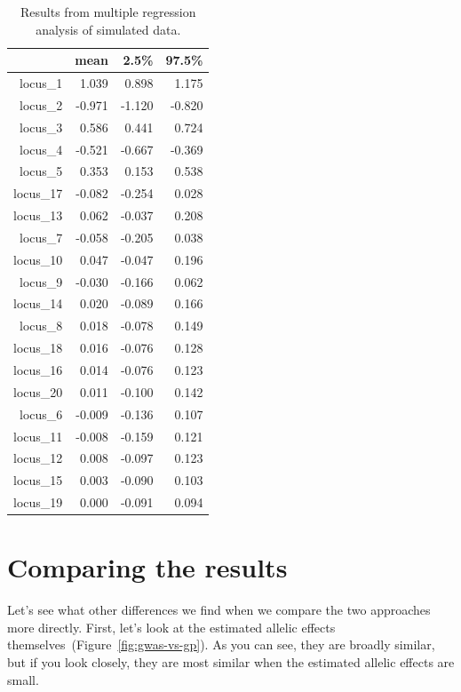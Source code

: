 \documentclass[12pt]{article}
\begin{document}
\begin{table}
\centering
\begin{tabular}{rrrr}
  \hline
 & mean & 2.5\% & 97.5\% \\ 
  \hline
locus\_1 & 1.039 & 0.898 & 1.175 \\
locus\_2 & -0.971 & -1.120 & -0.820 \\
locus\_3 & 0.586 & 0.441 & 0.724 \\
locus\_4 & -0.521 & -0.667 & -0.369 \\
locus\_5 & 0.353 & 0.153 & 0.538 \\
locus\_17 & -0.082 & -0.254 & 0.028 \\
locus\_13 & 0.062 & -0.037 & 0.208 \\
locus\_7 & -0.058 & -0.205 & 0.038 \\
locus\_10 & 0.047 & -0.047 & 0.196 \\
locus\_9 & -0.030 & -0.166 & 0.062 \\
locus\_14 & 0.020 & -0.089 & 0.166 \\
locus\_8 & 0.018 & -0.078 & 0.149 \\
locus\_18 & 0.016 & -0.076 & 0.128 \\
locus\_16 & 0.014 & -0.076 & 0.123 \\
locus\_20 & 0.011 & -0.100 & 0.142 \\
locus\_6 & -0.009 & -0.136 & 0.107 \\
locus\_11 & -0.008 & -0.159 & 0.121 \\
locus\_12 & 0.008 & -0.097 & 0.123 \\
locus\_15 & 0.003 & -0.090 & 0.103 \\
locus\_19 & 0.000 & -0.091 & 0.094 \\
  \hline
\end{tabular}
\caption{Results from multiple regression analysis of simulated
  data.}\label{table:multiple} 
\end{table}

\section*{Comparing the results}

Let's see what other differences we find when we compare the two
approaches more directly. First, let's look at the estimated allelic
effects themselves~(Figure~\ref{fig:gwas-vs-gp}). As you can see, they
are broadly similar, but if you look closely, they are most similar
when the estimated allelic effects are small.
\end{document}
